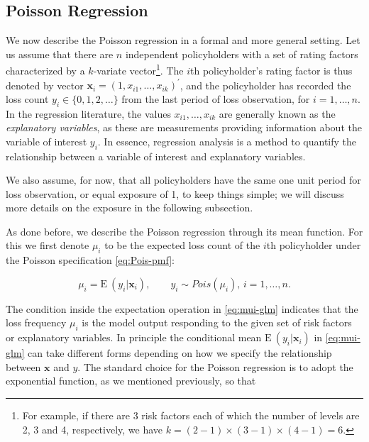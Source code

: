 \documentclass[]{book}
\let\rmarkdownfootnote\footnote%
\def\footnote{\protect\rmarkdownfootnote}
\theoremstyle{definition}
\theoremstyle{definition}
\theoremstyle{definition}
\theoremstyle{remark}
\begin{document}
\subsection{Poisson Regression}\label{poisson-regression}

We now describe the Poisson regression in a formal and more general
setting. Let us assume that there are \(n\) independent policyholders
with a set of rating factors characterized by a \(k\)-variate
vector\footnote{For example, if there are 3 risk factors each of which
  the number of levels are 2, 3 and 4, respectively, we have
  \(k=(2-1)\times(3-1)\times (4-1)=6\).}. The \(i\)th policyholder's
rating factor is thus denoted by vector
\(\mathbf{ x}_i=(1, x_{i1}, \ldots, x_{ik})^{\prime}\), and the
policyholder has recorded the loss count \(y_i \in \{0,1,2, \ldots \}\)
from the last period of loss observation, for \(i=1, \ldots, n\). In the
regression literature, the values \(x_{i1}, \ldots, x_{ik}\) are
generally known as the \emph{explanatory variables}, as these are
measurements providing information about the variable of interest
\(y_i\). In essence, regression analysis is a method to quantify the
relationship between a variable of interest and explanatory variables.

We also assume, for now, that all policyholders have the same one unit
period for loss observation, or equal exposure of 1, to keep things
simple; we will discuss more details on the exposure in the following
subsection.

As done before, we describe the Poisson regression through its mean
function. For this we first denote \(\mu_i\) to be the expected loss
count of the \(i\)th policyholder under the Poisson specification
\eqref{eq:Pois-pmf}:

\begin{equation}
\mu_i=\mathrm{E~}{(y_i|\mathbf{ x}_i)}, \qquad y_i \sim Pois(\mu_i), \, i=1, \ldots, n.
\label{eq:mui-glm}
\end{equation}

The condition inside the expectation operation in \eqref{eq:mui-glm}
indicates that the loss frequency \(\mu_i\) is the model output
responding to the given set of risk factors or explanatory variables. In
principle the conditional mean \(\mathrm{E~}{(y_i|\mathbf{ x}_i)}\) in
\eqref{eq:mui-glm} can take different forms depending on how we specify
the relationship between \(\mathbf{ x}\) and \(y\). The standard choice
for the Poisson regression is to adopt the exponential function, as we
mentioned previously, so that
\end{document}
